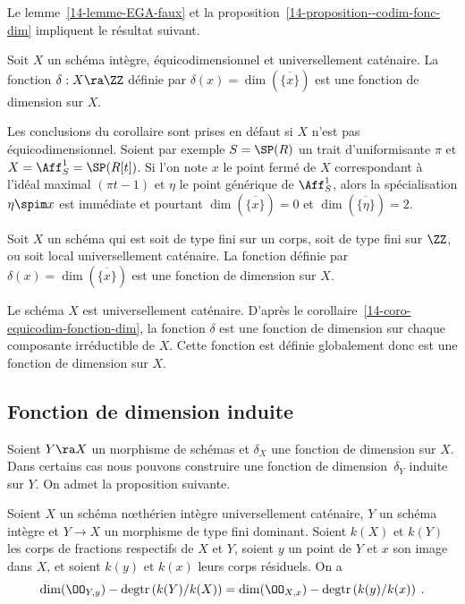 \documentclass[10pt]{../fichiers-configuration-latex/smfart}
\begin{document}
Le lemme~\ref{14-lemme-EGA-faux} et la proposition~\ref{14-proposition--codim-fonc-dim} impliquent
le résultat suivant.

\begin{corollaire2} \label{14-coro-equicodim-fonction-dim} Soit $X$ un schéma intègre,
équicodimensionnel et universellement caténaire. La fonction $\delta:X\ra\ZZ$ définie par $\delta(x)
= \dim(\overline{\{x\}})$ est une fonction de dimension sur $X$.  \end{corollaire2}

Les conclusions du corollaire sont prises en défaut si $X$ n'est pas équicodimensionnel. Soient par
exemple $S=\SP(R)$ un trait d'uniformisante $\pi$ et $X=\Aff^1_S=\SP(R[t])$. Si l'on note $x$ le
point fermé de $X$ correspondant à l'idéal maximal $(\pi t -1)$ et  $\eta$  le point générique de
$\Aff^1_S$, alors la spécialisation $\eta\spim x$ est immédiate et pourtant
$\dim(\overline{\{x\}})=0$ et $\dim(\overline{\{\eta\}})=2$.

\begin{corollaire2}\label{14-coro-schema-tf-sur-corps-fonc-dim} Soit $X$ un schéma qui est soit de
type fini sur un corps, soit de type fini sur $\ZZ$, ou soit local universellement caténaire. La
fonction définie par $\delta(x) = \dim(\overline{\{x\}})$ est une fonction de dimension sur $X$.
\end{corollaire2}

\begin{démo} Le schéma $X$ est universellement caténaire. D'après le
corollaire~\ref{14-coro-equicodim-fonction-dim}, la fonction $\delta$ est une fonction de dimension
sur chaque composante irréductible de $X$. Cette fonction est définie globalement donc est une
fonction de dimension sur $X$.  \end{démo}


\subsection{Fonction de dimension induite}

Soient $Y\ra X$ un morphisme de schémas et $\delta_X$ une fonction de dimension sur $X$. Dans
certains cas nous  pouvons construire une fonction de dimension~$\delta_Y$ induite sur $Y$. On admet
la proposition suivante.

\begin{proposition2}\label{14-Matsumura-14-C} Soient $X$ un schéma
nœthérien intègre universellement caténaire, $Y$ un schéma intègre et $Y\rightarrow X$ un morphisme
de type fini dominant. Soient $k(X)$ et $k(Y)$ les corps de fractions respectifs de $X$ et $Y$,
soient $y$ un point de $Y$ et $x$ son image dans $X$, et soient $k(y)$ et $k(x)$ leurs corps
résiduels. On a $$\dim(\OO_{Y, y}) - \mathrm{degtr}\left(k(Y)/k(X)\right)  =   \dim(\OO_{X, x})-
\mathrm{degtr}\left(k(y)/k(x)\right) \: .$$ \end{proposition2}
\end{document}
